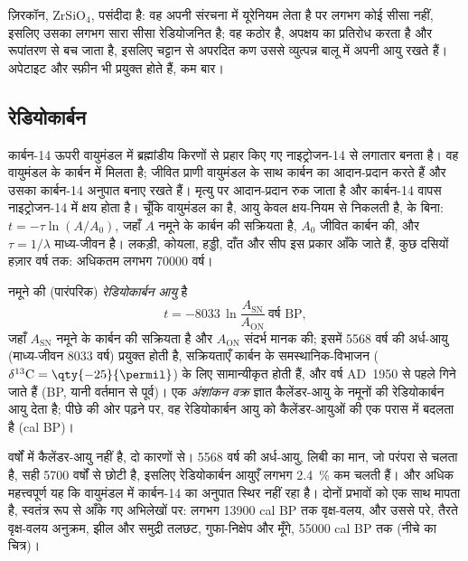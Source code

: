 ज़िरकॉन, $\mathrm{ZrSiO_4}$, पसंदीदा  है: वह अपनी संरचना में यूरेनियम लेता है पर लगभग कोई सीसा नहीं, इसलिए उसका लगभग सारा सीसा रेडियोजनित है; वह कठोर है, अपक्षय का प्रतिरोध करता है और रूपांतरण से बच जाता है, इसलिए चट्टान से अपरदित कण उससे व्युत्पन्न बालू में अपनी आयु रखते हैं। अपेटाइट और स्फ़ीन भी प्रयुक्त होते हैं, कम बार।

\subsection*{रेडियोकार्बन}

कार्बन-14 ऊपरी वायुमंडल में ब्रह्मांडीय किरणों से प्रहार किए गए नाइट्रोजन-14 से लगातार बनता है। वह वायुमंडल के कार्बन में मिलता है; जीवित प्राणी वायुमंडल के साथ कार्बन का आदान-प्रदान करते हैं और उसका कार्बन-14 अनुपात बनाए रखते हैं। मृत्यु पर आदान-प्रदान रुक जाता है और कार्बन-14 वापस नाइट्रोजन-14 में क्षय होता है। चूँकि  वायुमंडल का है, आयु केवल क्षय-नियम से निकलती है,  के बिना: $t = -\tau \ln(A/A_0)$, जहाँ $A$ नमूने के कार्बन की सक्रियता है, $A_0$ जीवित कार्बन की, और $\tau =
1/\lambda$ माध्य-जीवन है। लकड़ी, कोयला, हड्डी, दाँत और सीप इस प्रकार आँके जाते हैं, कुछ दसियों हज़ार वर्ष तक: अधिकतम लगभग \num{70000} वर्ष।

\begin{definition}[रेडियोकार्बन आयु, अंशांकन वक्र]\label{def:b1:radiometric-methods:radiocarbon}
नमूने की (पारंपरिक) \emph{रेडियोकार्बन आयु} है
\[
  t = -8033 \,\ln \frac{A_{\mathrm{SN}}}{A_{\mathrm{ON}}} \ \text{वर्ष BP},
\]
जहाँ $A_{\mathrm{SN}}$ नमूने के कार्बन की सक्रियता है और $A_{\mathrm{ON}}$ संदर्भ मानक की; इसमें \num{5568} वर्ष की अर्ध-आयु (माध्य-जीवन \num{8033} वर्ष) प्रयुक्त होती है, सक्रियताएँ कार्बन के समस्थानिक-विभाजन ($\delta^{13}\mathrm{C} = \qty{-25}{\permil}$) के लिए सामान्यीकृत होती हैं, और वर्ष AD~1950 से पहले गिने जाते हैं (BP, यानी वर्तमान से पूर्व)। एक \emph{अंशांकन वक्र} ज्ञात कैलेंडर-आयु के नमूनों की रेडियोकार्बन आयु देता है; पीछे की ओर पढ़ने पर, वह रेडियोकार्बन आयु को कैलेंडर-आयुओं की एक परास में बदलता है (cal BP)।
\end{definition}

 वर्षों में कैलेंडर-आयु नहीं है, दो कारणों से। \num{5568} वर्ष की अर्ध-आयु, लिबी का मान, जो परंपरा से चलता है, सही \num{5700} वर्षों से छोटी है, इसलिए रेडियोकार्बन आयुएँ लगभग \qty{2.4}{\percent} कम चलती हैं। और अधिक महत्त्वपूर्ण यह कि वायुमंडल में कार्बन-14 का अनुपात स्थिर नहीं रहा है।  दोनों प्रभावों को एक साथ मापता है, स्वतंत्र रूप से आँके गए अभिलेखों पर: लगभग \num{13900} cal BP तक वृक्ष-वलय, और उससे परे, तैरते वृक्ष-वलय अनुक्रम, झील और समुद्री तलछट, गुफा-निक्षेप और मूँगे, \num{55000} cal BP तक (नीचे का चित्र)।

